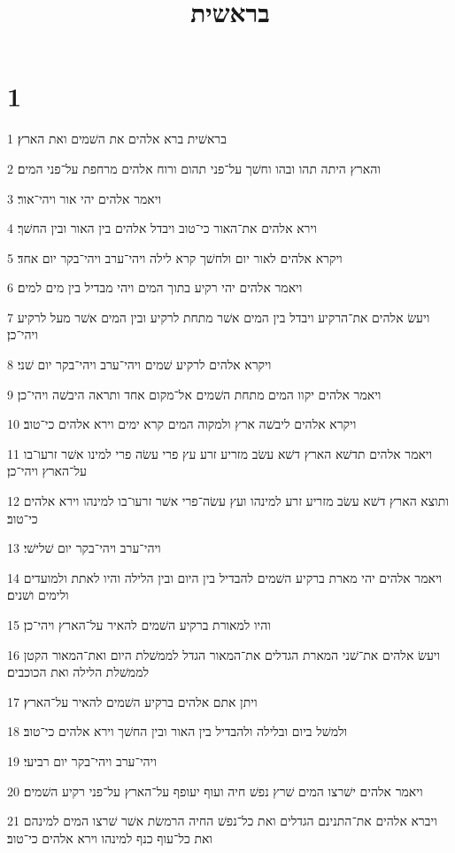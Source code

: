 

\title{בראשית}


\chapter{1}

\par 1 בראשׁית ברא אלהים את השׁמים ואת הארץ׃
\par 2 והארץ היתה תהו ובהו וחשׁך על־פני תהום ורוח אלהים מרחפת על־פני המים׃
\par 3 ויאמר אלהים יהי אור ויהי־אור׃
\par 4 וירא אלהים את־האור כי־טוב ויבדל אלהים בין האור ובין החשׁך׃
\par 5 ויקרא אלהים לאור יום ולחשׁך קרא לילה ויהי־ערב ויהי־בקר יום אחד׃
\par 6 ויאמר אלהים יהי רקיע בתוך המים ויהי מבדיל בין מים למים׃
\par 7 ויעשׂ אלהים את־הרקיע ויבדל בין המים אשׁר מתחת לרקיע ובין המים אשׁר מעל לרקיע ויהי־כן׃
\par 8 ויקרא אלהים לרקיע שׁמים ויהי־ערב ויהי־בקר יום שׁני׃
\par 9 ויאמר אלהים יקוו המים מתחת השׁמים אל־מקום אחד ותראה היבשׁה ויהי־כן׃
\par 10 ויקרא אלהים ליבשׁה ארץ ולמקוה המים קרא ימים וירא אלהים כי־טוב׃
\par 11 ויאמר אלהים תדשׁא הארץ דשׁא עשׂב מזריע זרע עץ פרי עשׂה פרי למינו אשׁר זרעו־בו על־הארץ ויהי־כן׃
\par 12 ותוצא הארץ דשׁא עשׂב מזריע זרע למינהו ועץ עשׂה־פרי אשׁר זרעו־בו למינהו וירא אלהים כי־טוב׃
\par 13 ויהי־ערב ויהי־בקר יום שׁלישׁי׃
\par 14 ויאמר אלהים יהי מארת ברקיע השׁמים להבדיל בין היום ובין הלילה והיו לאתת ולמועדים ולימים ושׁנים׃
\par 15 והיו למאורת ברקיע השׁמים להאיר על־הארץ ויהי־כן׃
\par 16 ויעשׂ אלהים את־שׁני המארת הגדלים את־המאור הגדל לממשׁלת היום ואת־המאור הקטן לממשׁלת הלילה ואת הכוכבים׃
\par 17 ויתן אתם אלהים ברקיע השׁמים להאיר על־הארץ׃
\par 18 ולמשׁל ביום ובלילה ולהבדיל בין האור ובין החשׁך וירא אלהים כי־טוב׃
\par 19 ויהי־ערב ויהי־בקר יום רביעי׃
\par 20 ויאמר אלהים ישׁרצו המים שׁרץ נפשׁ חיה ועוף יעופף על־הארץ על־פני רקיע השׁמים׃
\par 21 ויברא אלהים את־התנינם הגדלים ואת כל־נפשׁ החיה הרמשׂת אשׁר שׁרצו המים למינהם ואת כל־עוף כנף למינהו וירא אלהים כי־טוב׃
